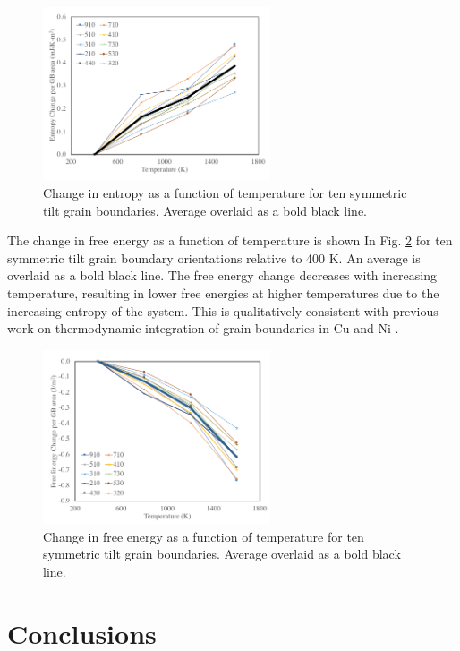 \documentclass[review]{elsarticle}
\begin{document}
\begin{figure}[h]
 \centering
 \includegraphics[width=0.6\textwidth]{entropy.png} 
 \caption{Change in entropy as a function of temperature for ten symmetric tilt grain boundaries. Average overlaid as a bold black line. }
 \label{fig:entropy}
\end{figure}

The change in free energy as a function of temperature is shown In Fig. \ref{fig:free} for ten symmetric tilt grain boundary orientations relative to 400 K. An average is overlaid as a bold black line. The free energy change decreases with increasing temperature, resulting in lower free energies at higher temperatures due to the increasing entropy of the system. This is qualitatively consistent with previous work on thermodynamic integration of grain boundaries in Cu \cite{frolov2012} and Ni \cite{foiles2010}. 

\begin{figure}[h]
 \centering
 \includegraphics[width=0.6\textwidth]{free.png} 
 \caption{Change in free energy as a function of temperature for ten symmetric tilt grain boundaries. Average overlaid as a bold black line.}
 \label{fig:free}
\end{figure}

\FloatBarrier

\section{Conclusions}
\end{document}
